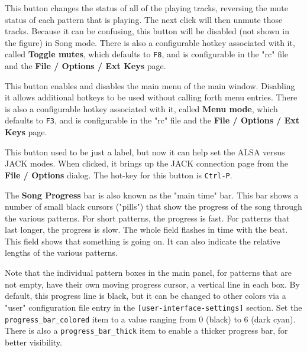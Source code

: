    This button changes the status of all of the playing tracks, reversing the
   mute status of each pattern that is playing.
   The next click will then unmute those tracks.
   Because it can be confusing, this button will be disabled (not shown
   in the figure) in Song mode.
   There is also a configurable hotkey associated with it, called
   \textbf{Toggle mutes},
   which defaults to \texttt{F8}, and is configurable in the "rc" file and
   the \textbf{File / Options / Ext Keys} page.

   This button enables and disables the main menu of the main window.
   Disabling it allows additional hotkeys to be used without calling forth menu
   entries.
   There is also a configurable hotkey associated with it, called
   \textbf{Menu mode},
   which defaults to \texttt{F3}, and is configurable in the "rc" file and
   the \textbf{File / Options / Ext Keys} page.

   This button used to be just a label, but now it can help set the ALSA versus
   JACK modes.  When clicked, it brings up the JACK connection page from the
   \textbf{File / Options} dialog.  The hot-key for this button
   is \texttt{Ctrl-P}.

   The \textbf{Song Progress} bar is also known as the "main time" bar.
   This bar shows a number of small black cursors ("pills") that show the
   progress of the song through the various patterns.  For short patterns,
   the progress is fast.  For patterns that last longer, the progress is
   slow.  The whole field flashes in time with the beat.
   This field shows that something is going on.  It can also indicate
   the relative lengths of the various patterns.
 
   Note that the individual pattern boxes in the main panel, for
   patterns that are not empty, have their own
   moving progress cursor, a vertical line in each box.
   By default, this progress line is black, but it can be changed to
   other colors via a "user" configuration file entry in the 
   \texttt{[user-interface-settings]} section.
   Set the \texttt{progress\_bar\_colored} item to a value ranging from 0
   (black) to 6 (dark cyan).
   There is also a \texttt{progress\_bar\_thick} item to enable a thicker
   progress bar, for better visibility.

